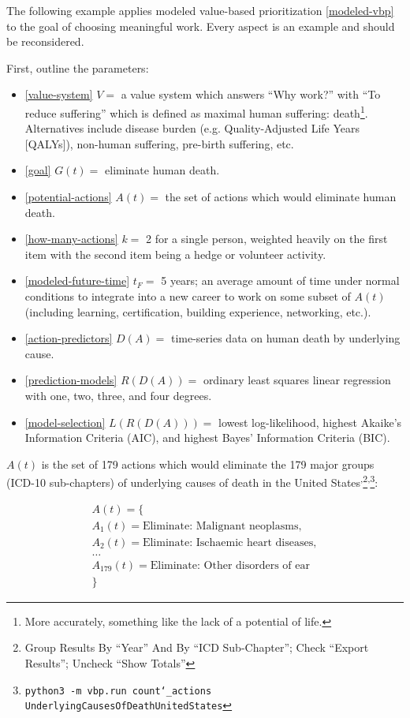 \documentclass[12pt, a4paper, twocolumn]{article}
\begin{document}
The following example applies modeled value-based prioritization \eqref{modeled-vbp} to the goal of choosing meaningful work. Every aspect is an example and should be reconsidered.

First, outline the parameters:

\begin{itemize}
\item \eqref{value-system} $V = $ a value system which answers \enquote{Why work?} with \enquote{To reduce suffering} which is defined as maximal human suffering: death\footnote{More accurately, something like the lack of a potential of life.}. Alternatives include disease burden (e.g. Quality-Adjusted Life Years [QALYs]\cite{weinstein2009qalys}), non-human suffering, pre-birth suffering, etc.
\item \eqref{goal} $G(t) = $ eliminate human death.
\item \eqref{potential-actions} $A(t) = $ the set of actions which would eliminate human death.
\item \eqref{how-many-actions} $k = $ 2 for a single person, weighted heavily on the first item with the second item being a hedge or volunteer activity.
\item \eqref{modeled-future-time} $t_F = $ 5 years; an average amount of time under normal conditions to integrate into a new career to work on some subset of $A(t)$ (including learning, certification, building experience, networking, etc.).
\item \eqref{action-predictors} $D(A) = $ time-series data on human death by underlying cause.
\item \eqref{prediction-models} $R(D(A)) = $ ordinary least squares linear regression with one, two, three, and four degrees.
\item \eqref{model-selection} $L(R(D(A))) = $ lowest log-likelihood, highest Akaike’s Information Criteria (AIC), and highest Bayes' Information Criteria (BIC).
\end{itemize}

$A(t)$ is the set of 179 actions which would eliminate the 179 major groups (ICD-10 sub-chapters\cite{icd10}) of underlying causes of death in the United States\cite{centers2017underlying}\textsuperscript{,}\footnote{Group Results By \enquote{Year} And By \enquote{ICD Sub-Chapter}; Check \enquote{Export Results}; Uncheck \enquote{Show Totals}}\textsuperscript{,}\footnote{\texttt{python3 -m vbp.run count\char`_actions UnderlyingCausesOfDeathUnitedStates}}:

\begin{equation*}
\begin{gathered}
A(t) = \{\\
A_1(t) = \textrm{Eliminate: Malignant neoplasms},\\
A_2(t) = \textrm{Eliminate: Ischaemic heart diseases},\\
\textrm{\ldots}\\
A_{179}(t) = \textrm{Eliminate: Other disorders of ear}\\
\}
\end{gathered}
\end{equation*}
\end{document}
